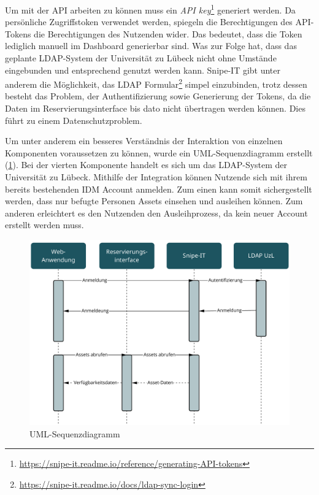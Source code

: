 Um mit der API arbeiten zu können muss ein \textit{API
  key}\footnote{\url{https://snipe-it.readme.io/reference/generating-API-tokens}} generiert werden.
  Da persönliche Zugriffstoken verwendet werden, spiegeln die Berechtigungen des API-Tokens die
  Berechtigungen des Nutzenden wider. Das bedeutet, dass die Token lediglich manuell im Dashboard
  generierbar sind. Was zur Folge hat, dass das geplante LDAP-System der Universität zu Lübeck nicht
  ohne Umstände eingebunden und entsprechend genutzt werden kann. Snipe-IT gibt unter anderem die
  Möglichkeit, das LDAP Formular\footnote{\url{https://snipe-it.readme.io/docs/ldap-sync-login}}
  simpel einzubinden, trotz dessen besteht das Problem, der Authentifizierung sowie Generierung der
  Tokens, da die Daten im Reservierungsinterface bis dato nicht übertragen werden können. Dies führt
  zu einem Datenschutzproblem.


Um unter anderem ein besseres Verständnis der Interaktion von einzelnen Komponenten voraussetzen zu
können, wurde ein UML-Sequenzdiagramm erstellt (\ref{fig:uml}). Bei der vierten Komponente handelt
es sich um das LDAP-System der Universität zu Lübeck. Mithilfe der Integration können Nutzende sich
mit ihrem bereits bestehenden IDM Account anmelden. Zum einen kann somit sichergestellt werden, dass
nur befugte Personen Assets einsehen und ausleihen können. Zum anderen erleichtert es den Nutzenden
den Ausleihprozess, da kein neuer Account erstellt werden muss.

\begin{figure}[h]
    \centering
    \includegraphics[scale=0.45]{Bilder/uml.pdf}
    \caption[UML-Sequenzdiagramm]{UML-Sequenzdiagramm}
    \label{fig:uml}
\end{figure}

